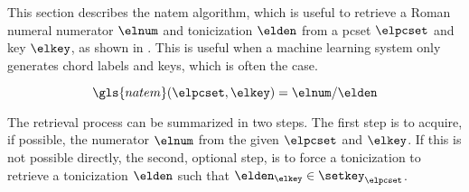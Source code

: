 
This section describes the \gls{natem} algorithm, which is
useful to retrieve a Roman numeral numerator $\elnum$ and
tonicization $\elden$ from a \gls{pcset} $\elpcset$ and key
$\elkey$, as shown in . This is useful when a
machine learning system only generates chord labels and
keys, which is often the case. 

\begin{equation}
    \label{eq:natem}
    \gls{natem}(\elpcset, \elkey) = \elnum\text{/}\elden
\end{equation}

The retrieval process can be summarized in two steps. The
first step is to acquire, if possible, the numerator
$\elnum$ from the given $\elpcset$ and $\elkey$. If this is
not possible directly, the second, optional step, is to
force a tonicization to retrieve a tonicization $\elden$
such that $\elden_\elkey \in \setkey_\elpcset$.


